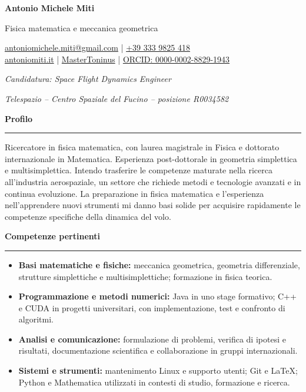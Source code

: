 \documentclass[10pt,a4paper]{article}
\newcommand{\cvsection}[1]{%
    \Needspace{4\baselineskip}%
    \vspace{0.8em}%
    {\large\bfseries\color{accent} #1}\par
    \vspace{0.2em}\hrule\vspace{0.45em}%
}
\begin{document}
{\Huge\bfseries Antonio Michele Miti}\par
\vspace{0.25em}
{\large\color{accent} Fisica matematica e meccanica geometrica}\par
    \vspace{0.1em}
    \begin{center}
        \href{mailto:antoniomichele.miti@gmail.com}{%
                \faEnvelope\enspace antoniomichele.miti@gmail.com}  |
        \href{tel:+393339825418}{\faPhone\enspace +39 333 9825 418} \\[3pt]
        \href{https://www.antoniomiti.it/}{\faGlobe\enspace antoniomiti.it} |
        \href{https://github.com/MasterToninus}{\faGithub\enspace MasterToninus} |
        \href{https://orcid.org/0000-0002-8829-1943}{%
            \faOrcid\enspace ORCID: 0000-0002-8829-1943}
    \end{center}
    \vspace{0.1em}
\textit{Candidatura: Space Flight Dynamics Engineer}\par
\textit{Telespazio -- Centro Spaziale del Fucino -- posizione R0034582}\par


\cvsection{Profilo}
Ricercatore in fisica matematica, con laurea magistrale in Fisica e dottorato internazionale in Matematica. Esperienza post-dottorale in geometria simplettica e multisimplettica. Intendo trasferire le competenze maturate nella ricerca all'industria aerospaziale, un settore che richiede metodi e tecnologie avanzati e in continua evoluzione. La preparazione in fisica matematica e l'esperienza nell'apprendere nuovi strumenti mi danno basi solide per acquisire rapidamente le competenze specifiche della dinamica del volo.

\cvsection{Competenze pertinenti}
\begin{itemize}
    \item \textbf{Basi matematiche e fisiche:} meccanica geometrica, geometria differenziale, strutture simplettiche e multisimplettiche; formazione in fisica teorica.
    \item \textbf{Programmazione e metodi numerici:} Java in uno stage formativo; C++ e CUDA in progetti universitari, con implementazione, test e confronto di algoritmi.
    \item \textbf{Analisi e comunicazione:} formulazione di problemi, verifica di ipotesi e risultati, documentazione scientifica e collaborazione in gruppi internazionali.
    \item \textbf{Sistemi e strumenti:} mantenimento Linux e supporto utenti; Git e \LaTeX; Python e Mathematica utilizzati in contesti di studio, formazione e ricerca.
\end{itemize}
\end{document}
